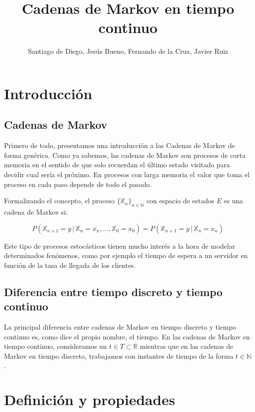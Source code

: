 \documentclass[12pt,a4paper]{article}
\author{Santiago de Diego, Jesús Bueno, Fernando de la Cruz, Javier Ruiz}
\title{Cadenas de Markov en tiempo continuo}
\date{}
\begin{document}
\maketitle
\newtheorem{theorem}{Teorema}[section]
\newtheorem{lemma}{Lema}[section]
\newtheorem{proof}{Demostración}[section]
\newtheorem{prop}{Proposición}[section]
\newtheorem{definition}{Definición}[section]
\newpage
\tableofcontents
\newpage
\section{Introducción}
\subsection{Cadenas de Markov}
Primero de todo, presentamos una introducción a las Cadenas de Markov de forma genérica. Como ya sabemos, las cadenas de Markov son procesos de corta memoria en el sentido de que solo recuerdan el último estado visitado para decidir cual sería el próximo. En procesos con larga memoria el valor que toma el proceso en cada paso depende de todo el pasado.

Formalizando el concepto, el proceso $\{\mathbb{X}_n \}_{n\in \mathbb{N}}$ con espacio de estados $E$ es una cadena de Markov si:

$$P(\mathbb{X}_{n+1}=y \, | \, \mathbb{X}_n = x_n , \ldots , \mathbb{X}_0 = x_0)=P(\mathbb{X}_{n+1}=y \, | \, {\mathbb{X}_n=x_n})$$

Este tipo de procesos estocásticos tienen mucho interés a la hora de modelar determinados fenómenos, como por ejemplo el tiempo de espera a un servidor en función de la tasa de llegada de los clientes.

\subsection{Diferencia entre tiempo discreto y tiempo continuo}
La principal diferencia entre cadenas de Markov en tiempo discreto y tiempo continuo es, como dice el propio nombre, el tiempo. En las cadenas de Markov en tiempo continuo, consideramos un $t\in T \subset \mathbb{R}$ mientras que en las cadenas de Markov en tiempo discreto, trabajamos con instantes de tiempo de la forma $t\in \mathbb{N}$.
\section{Definición y propiedades}
\end{document}
